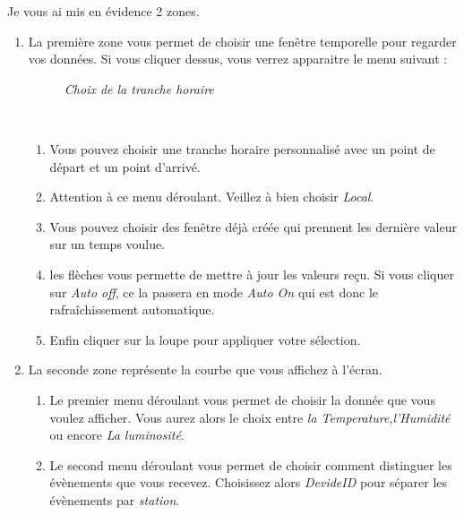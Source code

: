 Je vous ai mis en évidence 2 zones. 
\begin{enumerate}
\item La première zone vous permet de choisir une fenêtre temporelle pour regarder vos données. Si vous cliquer dessus, vous verrez apparaitre le menu suivant :\\

\begin{figure}[H]
\begin{center}
\end{center}
	\caption{ \textit{Choix de la tranche horaire}}
\end{figure}\\

\begin{enumerate}
\item Vous pouvez choisir une tranche horaire personnalisé avec un point de départ et un point d'arrivé.
\item Attention à ce menu déroulant. Veillez à bien choisir \textit{Local}.
\item Vous pouvez choisir des fenêtre déjà créée qui prennent les dernière valeur sur un temps voulue.
\item les flèches vous permette de mettre à jour les valeurs reçu. Si vous cliquer sur \textit{Auto off}, ce la passera en mode \textit{Auto On} qui est donc le rafraîchissement automatique.
\item Enfin cliquer sur la loupe pour appliquer votre sélection.
\end{enumerate}

\item La seconde zone représente la courbe que vous affichez à l'écran.
\begin{enumerate}
\item Le premier menu déroulant vous permet de choisir la donnée que vous voulez afficher. Vous aurez alors le choix entre  \textit{la Temperature},\textit{l'Humidité} ou encore \textit{La luminosité}.
\item Le second menu déroulant vous permet de choisir comment distinguer les évènements que vous recevez. Choisissez alors \textit{DevideID} pour séparer les évènements par \textit{station}. 
\end{enumerate}
\end{enumerate}












	
	




